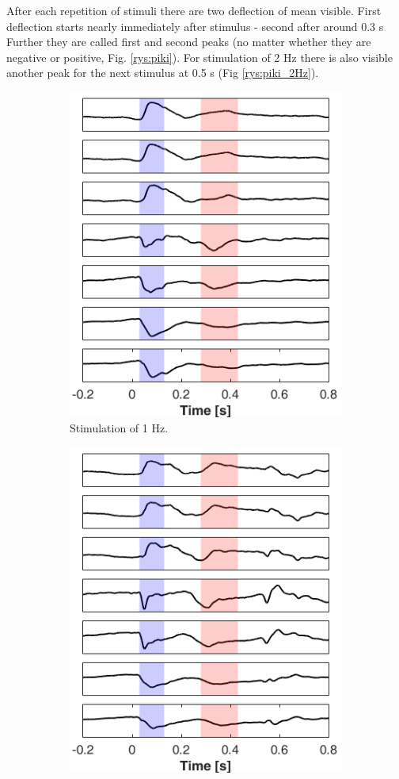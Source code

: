\documentclass{pracalicmgr}
\begin{document}
	After each repetition of stimuli there are two deflection of mean visible. First deflection starts nearly immediately after stimulus - second after around 0.3 s  Further they are called first and second peaks (no matter whether they are negative or positive, Fig. \ref{rys:piki}). For stimulation of 2 Hz there is also visible another peak for the next stimulus at 0.5 s (Fig \ref{rys:piki_2Hz}). 
	
	\begin{figure}[H]
		
	\begin{subfigure}{.5\textwidth}
	\centering
	\includegraphics[width=0.8\linewidth]{wybieranie_1Hz.png}
	\caption{Stimulation of 1 Hz.}
	\label{rys:piki_1Hz}
	\end{subfigure}
	\begin{subfigure}{.5\textwidth}
	\centering
	\includegraphics[width=0.8\linewidth]{wybieranie_2Hz.png}

\end{subfigure}
\end{figure}
\end{document}
